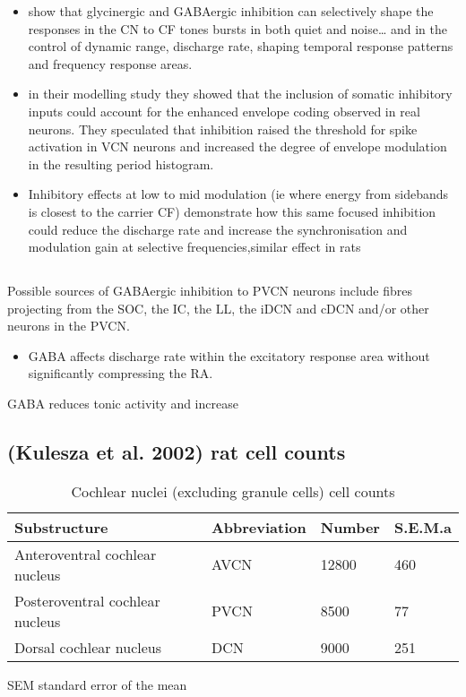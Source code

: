 \documentclass[10pt,a4paper]{article}
\begin{document}
\begin{itemize}
\item
  \citep{CasparyBackoffEtAl:1994,CasparyHelfertEtAl:1997,CasparyPalombiEtAl:1993,EbertOstwald:1995,PalombiCaspary:1992}
  show that glycinergic and GABAergic inhibition can selectively shape the
  responses in the CN to CF tones bursts in both quiet and noise{\dots} and in
  the control of dynamic range, discharge rate, shaping temporal response
  patterns and frequency response areas.
\item \citep{WangSachs:1995,WangSachsEtAl:1992} in their modelling study they
  showed that the inclusion of somatic inhibitory inputs could account for the
  enhanced envelope coding observed in real neurons.  They speculated that
  inhibition raised the threshold for spike activation in VCN neurons and
  increased the degree of envelope modulation in the resulting period histogram.
\item Inhibitory effects at low to mid modulation (ie where energy from
  sidebands is closest to the carrier CF) demonstrate how this same focused
  inhibition could reduce the discharge rate and increase the synchronisation
  and modulation gain at selective frequencies,similar effect in rats
  \citep{Moller:1972}
\end{itemize}

\subsection{\citep{PalombiCaspary:1992}}
Possible sources of GABAergic inhibition to PVCN
neurons include fibres projecting from the SOC, the IC, the LL, the iDCN and
cDCN and/or other neurons in the PVCN.


\begin{itemize}
\item GABA affects discharge rate within the excitatory response area without  significantly compressing the RA.
\end{itemize}

GABA reduces tonic activity and increase
\subsection{(Kulesza et al. 2002) rat cell counts}

\begin{table}[h]
\caption{Cochlear nuclei (excluding granule cells) cell counts}
\begin{tabularx}{\textwidth}{XXXX}
\toprule
         Substructure           & Abbreviation & Number & S.E.M.a \\ \midrule
Anteroventral cochlear nucleus  &     AVCN     & 12800  & 460 \\
Posteroventral cochlear nucleus &     PVCN     &  8500  & 77 \\
    Dorsal cochlear nucleus     &     DCN      &  9000  & 251 \\
\bottomrule
\end{tabularx}
\footnotesize{SEM standard error of the mean}
\end{table}
\end{document}
